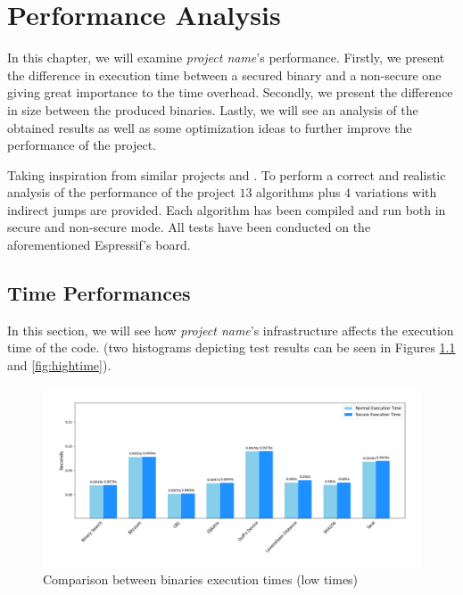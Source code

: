 \chapter{Performance Analysis}
\label{cha:pa}

In this chapter, we will examine \textit{project name}'s performance. Firstly,
we present the difference in execution time between a secured binary and a non-secure
one giving great importance to the time overhead. Secondly, we present the
difference in size between the produced binaries. Lastly, we will see an
analysis of the obtained results as well as some optimization ideas to further
improve the performance of the project.

Taking inspiration from similar projects \cite{article1} and \cite{article2}. To
perform a correct and realistic analysis of the performance of the project $13$ algorithms
plus $4$ variations with indirect jumps are provided. Each algorithm has been
compiled and run both in secure and non-secure mode. All tests have been conducted
on the aforementioned Espressif's board.

\section{Time Performances}
\label{sec:pa_time}

In this section, we will see how \textit{project name}'s infrastructure affects
the execution time of the code. (two histograms depicting test results can be
seen in Figures \ref{fig:lowtime} and \ref{fig:hightime}).

\begin{figure}[htbp]
  \centering
  \includegraphics[width=.9\linewidth]{images/low_execution.png}
  \caption{Comparison between binaries execution times (low times)}
  \label{fig:lowtime}
\end{figure}

